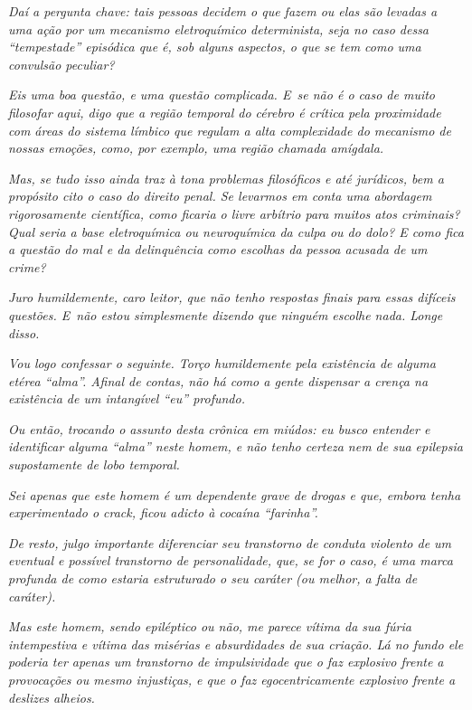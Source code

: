 \emph{Daí a pergunta chave: tais pessoas decidem o que fazem ou elas são
levadas a uma ação por um mecanismo eletroquímico determinista, seja no
caso dessa ``tempestade'' episódica que é, sob alguns aspectos, o que se
tem como uma convulsão peculiar?}~

\emph{Eis uma boa questão, e uma questão complicada. E~se não é o caso
de muito filosofar aqui, digo que a região temporal do cérebro é crítica
pela proximidade com áreas do sistema límbico que regulam a alta
complexidade do mecanismo de nossas emoções, como, por exemplo, uma
região chamada amígdala.}~

\emph{Mas, se tudo isso ainda traz à tona problemas filosóficos e até
jurídicos, bem a propósito cito o caso do direito penal. Se levarmos em
conta uma abordagem rigorosamente científica, como ficaria o livre
arbítrio para muitos atos criminais? Qual seria a base eletroquímica ou
neuroquímica da culpa ou do dolo? E como fica a questão do mal e da
delinquência como escolhas da pessoa acusada de um crime?}~

\emph{Juro humildemente, caro leitor, que não tenho respostas finais
para essas difíceis questões. E~não estou simplesmente dizendo que
ninguém escolhe nada. Longe disso.}~

\emph{Vou logo confessar o seguinte. Torço humildemente pela existência
de alguma etérea ``alma''. Afinal de contas, não há como a gente
dispensar a crença na existência de um intangível ``eu'' profundo.}~

\emph{Ou então, trocando o assunto desta crônica em miúdos: eu busco
entender e identificar alguma ``alma'' neste homem, e não tenho certeza
nem de sua epilepsia supostamente de lobo temporal.}~

\emph{Sei apenas que este homem é um dependente grave de drogas e que,
embora tenha experimentado o crack, ficou adicto à cocaína
``farinha''.}~

\emph{De resto, julgo importante diferenciar seu transtorno de conduta
violento de um eventual e possível transtorno de personalidade, que, se
for o caso, é uma marca profunda de como estaria estruturado o seu
caráter (ou melhor, a falta de caráter).}~

\emph{Mas este homem, sendo epiléptico ou não, me parece vítima da sua
fúria intempestiva e vítima das misérias e absurdidades de sua criação.
Lá no fundo ele poderia ter apenas um transtorno de impulsividade que o
faz explosivo frente a provocações ou mesmo injustiças, e que o faz
egocentricamente explosivo frente a deslizes alheios.}~

